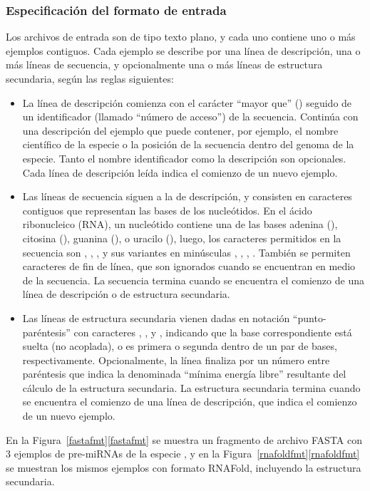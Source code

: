 %
%
\subsubsection{Especificación del formato de entrada}
%
Los archivos de entrada son de tipo texto plano, y cada uno
contiene uno o más ejemplos contiguos.
Cada ejemplo se describe por una línea de descripción, una o más
líneas de secuencia, y opcionalmente una o más líneas de estructura
secundaria, según las reglas siguientes:
%
\begin{itemize}
\item
  La línea de descripción comienza con el carácter ``mayor que''
  (\mono{>}) seguido de un identificador (llamado ``número de
  acceso'') de la secuencia.
  Continúa con una descripción del ejemplo que puede contener, por
  ejemplo, el nombre científico de la especie o la posición de la
  secuencia dentro del genoma de la especie.
  Tanto el nombre identificador como la descripción son opcionales.
  Cada línea de descripción leída indica el comienzo de un nuevo
  ejemplo.
\item
  Las líneas de secuencia siguen a la de descripción, y consisten en
  caracteres contiguos que representan las bases de los nucleótidos.
  En el ácido ribonucleico (RNA), un nucleótido contiene una de las
  bases adenina (), citosina (), guanina (), o
  uracilo (), luego, los caracteres permitidos en la secuencia
  son , , ,  y sus variantes en
  minúsculas , , , .
  También se permiten caracteres de fin de línea, que son ignorados
  cuando se encuentran en medio de la secuencia.
  La secuencia termina cuando se encuentra el comienzo de una línea de
  descripción o de estructura secundaria.
\item
  Las líneas de estructura secundaria vienen dadas en notación
  ``punto-paréntesis'' con caracteres , \mono{(}, y \mono{)},
  indicando que la base correspondiente está suelta (no acoplada), o
  es primera o segunda dentro de un par de bases, respectivamente.
  Opcionalmente, la línea finaliza por un número entre paréntesis que
  indica la denominada ``mínima energía libre'' resultante del cálculo
  de la estructura secundaria.
  La estructura secundaria termina cuando se encuentra el comienzo de
  una línea de descripción, que indica el comienzo de un nuevo
  ejemplo.
\end{itemize}
%
En la \iflatexml{}Figura~\ref{fastafmt}\else\autoref{fastafmt}\fi{} se
muestra un fragmento de archivo FASTA con 3 ejemplos de pre-miRNAs de
la especie , y en la
\iflatexml{}Figura~\ref{rnafoldfmt}\else\autoref{rnafoldfmt}\fi{} se
muestran los mismos ejemplos con formato RNAFold, incluyendo la
estructura secundaria.
